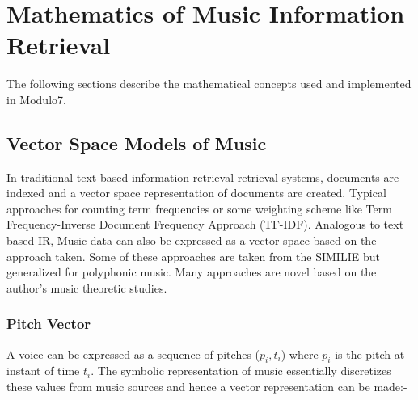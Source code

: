 \chapter{Mathematics of Music Information Retrieval}
\label{sec:mir math}

\noindent The following sections describe the mathematical concepts used and implemented in Modulo7. 

\section{Vector Space Models of Music}

\noindent In traditional text based information retrieval retrieval systems, documents are indexed and a vector space representation of documents are created. Typical approaches for counting term frequencies or some weighting scheme like Term Frequency-Inverse Document Frequency Approach (TF-IDF). Analogous to text based IR, Music data can also be expressed as a vector space based on the approach taken. Some of these approaches are taken from the SIMILIE \cite{similie} but generalized for polyphonic music. Many approaches are novel based on the author's music theoretic studies. 

\subsection{Pitch Vector}

\noindent A voice can be expressed as a sequence of pitches ($p_i, t_i$) where $p_i$ is the pitch at instant of time $t_i$. The symbolic representation of music essentially discretizes these values from music sources and hence a vector representation can be made:-



